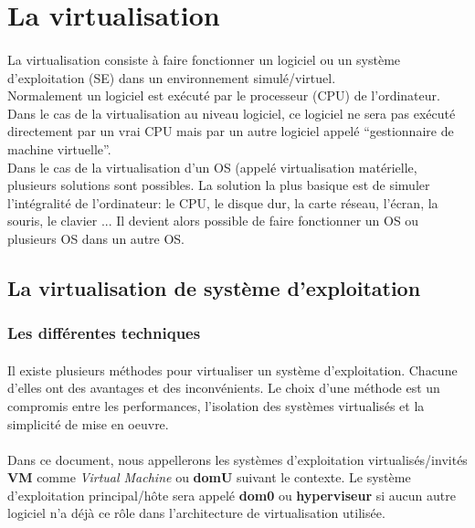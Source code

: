 \section{La virtualisation}
\label{virtualisation}
\paragraph*{}
La virtualisation consiste à faire fonctionner un logiciel ou un système d'exploitation (SE) dans un environnement simulé/virtuel.
\\
Normalement un logiciel est exécuté par le processeur (CPU) de l'ordinateur. Dans le cas de la virtualisation au niveau logiciel,
ce logiciel ne sera pas exécuté directement par un vrai CPU mais par un autre logiciel appelé ``gestionnaire de machine virtuelle''.
\\
Dans le cas de la virtualisation d'un OS (appelé virtualisation matérielle, plusieurs solutions sont possibles. La solution la plus basique est de simuler l'intégralité
de l'ordinateur: le CPU, le disque dur, la carte réseau, l'écran, la souris, le clavier ...
Il devient alors possible de faire fonctionner un OS ou plusieurs OS dans un autre OS.

\subsection{La virtualisation de système d'exploitation}
\label{virtualisation_mat}
\subsubsection{Les différentes techniques}
\paragraph*{}
Il existe plusieurs méthodes pour virtualiser un système d'exploitation. Chacune d'elles ont des avantages et des
inconvénients. Le choix d'une méthode est un compromis entre les performances, l'isolation des systèmes virtualisés
et la simplicité de mise en oeuvre.

\paragraph*{}
Dans ce document, nous appellerons les systèmes d'exploitation virtualisés/invités \textbf{VM} comme \emph{Virtual Machine} ou \textbf{domU} suivant le contexte.
Le système d'exploitation principal/hôte sera appelé \textbf{dom0} ou \textbf{hyperviseur} si aucun autre logiciel n'a déjà ce rôle dans l'architecture de virtualisation
utilisée.

